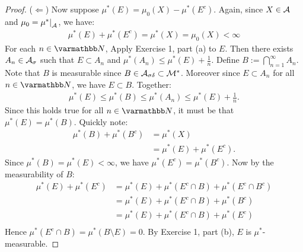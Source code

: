 \begin{proof}
        ($\Leftarrow$) Now suppose $\mu^\ast(E) = \mu_0(X) - \mu^\ast(E^c)$. Again, since $X\in \mathcal{A}$ and $\mu_0 = \restr{\mu^\ast}{\cA}$, we have:
            \begin{equation*}
            \begin{split}
                \mu^\ast(E) + \mu^\ast(E^c) = \mu^\ast(X) = \mu_0(X) < \infty
            \end{split}
            \end{equation*}
        For each $n \in \bfN$, Apply Exercise 1, part (a) to $E$. Then there exists $A_n \in \mathcal{A}_\sigma$ such that $E \subset A_n$ and $\mu^\ast(A_n) \leq \mu^\ast(E) + \frac{1}{n}$. Define $B := \bigcap_{n = 1}^\infty A_n$. Note that $B$ is measurable since $B \in \mathcal{A}_{\sigma\delta} \subset \mathcal{M}^\ast$. Moreover since $E \subset A_n$ for all $n \in \bfN$, we have $E \subset B$. Together:
            \begin{equation*}
            \begin{split}
                \mu^\ast(E) \leq \mu^\ast(B) \leq \mu^\ast(A_n) \leq \mu^\ast(E) + \frac{1}{n}.
            \end{split}
            \end{equation*}
        Since this holds true for all $n \in \bfN$, it must be that $\mu^\ast(E) = \mu^\ast(B)$. Quickly note:
            \begin{equation*}
            \begin{split}
                \mu^\ast(B) + \mu^\ast(B^c) 
                & = \mu^\ast(X) \\
                & = \mu^\ast(E) + \mu^\ast(E^c).
            \end{split}
            \end{equation*}
        Since $\mu^\ast(B) = \mu^\ast(E) < \infty$, we have $\mu^\ast(E^c) = \mu^\ast(B^c)$. Now by the measurability of $B$:
            \begin{equation*}
            \begin{split}
                \mu^\ast (E) + \mu^\ast(E^c) 
                & = \mu^\ast(E) + \mu^\ast(E^c \cap B) + \mu^\ast(E^c \cap B^c) \\
                & = \mu^\ast(E) + \mu^\ast(E^c \cap B) + \mu^\ast(B^c) \\
                & = \mu^\ast(E) + \mu^\ast(E^c \cap B) + \mu^\ast(E^c) \\
            \end{split}
            \end{equation*}
        Hence $\mu^\ast(E^c \cap B) = \mu^\ast(B \setminus E) = 0$. By Exercise 1, part (b), $E$ is $\mu^\ast$-measurable.
    \end{proof}

